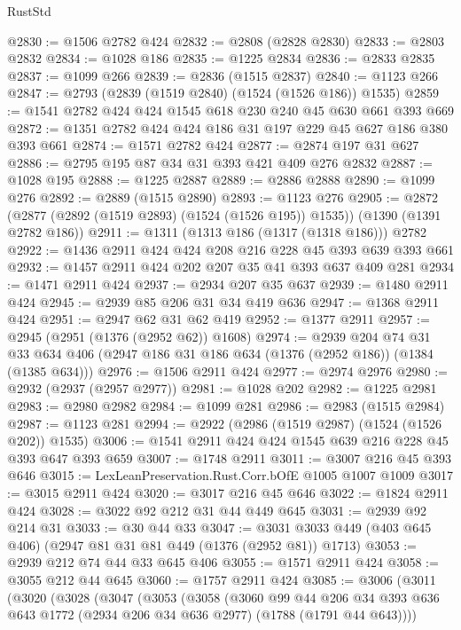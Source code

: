 \begin{lexlean}{RustStd}
\begin{coremodule}
@2830 := @1506 @2782 @424
@2832 := @2808 (@2828 @2830)
@2833 := @2803 @2832
@2834 := @1028 @186
@2835 := @1225 @2834
@2836 := @2833 @2835
@2837 := @1099 @266
@2839 := @2836 (@1515 @2837)
@2840 := @1123 @266
@2847 := @2793 (@2839 (@1519 @2840) (@1524 (@1526 @186)) @1535)
@2859 := @1541 @2782 @424 @424 @1545 @618 @230 @240 @45 @630 @661 @393 @669
@2872 := @1351 @2782 @424 @424 @186 @31 @197 @229 @45 @627 @186 @380 @393 @661
@2874 := @1571 @2782 @424
@2877 := @2874 @197 @31 @627
@2886 := @2795 @195 @87 @34 @31 @393 @421 @409 @276 @2832
@2887 := @1028 @195
@2888 := @1225 @2887
@2889 := @2886 @2888
@2890 := @1099 @276
@2892 := @2889 (@1515 @2890)
@2893 := @1123 @276
@2905 := @2872 (@2877 (@2892 (@1519 @2893) (@1524 (@1526 @195)) @1535)) (@1390 (@1391 @2782 @186))
@2911 := @1311 (@1313 @186 (@1317 (@1318 @186))) @2782
@2922 := @1436 @2911 @424 @424 @208 @216 @228 @45 @393 @639 @393 @661
@2932 := @1457 @2911 @424 @202 @207 @35 @41 @393 @637 @409 @281
@2934 := @1471 @2911 @424
@2937 := @2934 @207 @35 @637
@2939 := @1480 @2911 @424
@2945 := @2939 @85 @206 @31 @34 @419 @636
@2947 := @1368 @2911 @424
@2951 := @2947 @62 @31 @62 @419
@2952 := @1377 @2911
@2957 := @2945 (@2951 (@1376 (@2952 @62)) @1608)
@2974 := @2939
    @204
    @74
    @31
    @33
    @634
    @406
    (@2947 @186 @31 @186 @634 (@1376 (@2952 @186)) (@1384 (@1385 @634)))
@2976 := @1506 @2911 @424
@2977 := @2974 @2976
@2980 := @2932 (@2937 (@2957 @2977))
@2981 := @1028 @202
@2982 := @1225 @2981
@2983 := @2980 @2982
@2984 := @1099 @281
@2986 := @2983 (@1515 @2984)
@2987 := @1123 @281
@2994 := @2922 (@2986 (@1519 @2987) (@1524 (@1526 @202)) @1535)
@3006 := @1541 @2911 @424 @424 @1545 @639 @216 @228 @45 @393 @647 @393 @659
@3007 := @1748 @2911
@3011 := @3007 @216 @45 @393 @646
@3015 := LexLeanPreservation.Rust.Corr.bOfE @1005 @1007 @1009
@3017 := @3015 @2911 @424
@3020 := @3017 @216 @45 @646
@3022 := @1824 @2911 @424
@3028 := @3022 @92 @212 @31 @44 @449 @645
@3031 := @2939 @92 @214 @31
@3033 := @30 @44 @33
@3047 := @3031 @3033 @449 (@403 @645 @406) (@2947 @81 @31 @81 @449 (@1376 (@2952 @81)) @1713)
@3053 := @2939 @212 @74 @44 @33 @645 @406
@3055 := @1571 @2911 @424
@3058 := @3055 @212 @44 @645
@3060 := @1757 @2911 @424
@3085 := @3006
    (@3011
      (@3020
        (@3028
          (@3047
            (@3053
              (@3058
                (@3060
                  @99
                  @44
                  @206
                  @34
                  @393
                  @636
                  @643
                  @1772
                  (@2934 @206 @34 @636 @2977)
                  (@1788 (@1791 @44 @643))))

\end{coremodule}
\end{lexlean}
